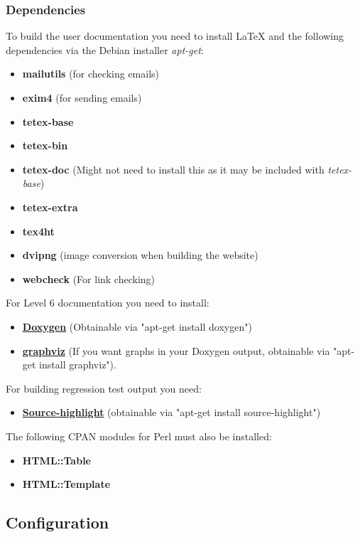 \documentclass[12pt]{article}
\begin{document}
\subsubsection*{Dependencies}

To build the user documentation you need to install \LaTeX\,\,and the following dependencies via the Debian installer {\it apt-get}:
\begin{itemize}
\item[]{\bf mailutils} (for checking emails)
\item[]{\bf exim4} (for sending emails)
\item[]{\bf tetex-base}
\item[]{\bf tetex-bin}
\item[]{\bf tetex-doc} (Might not need to install this as it may be included with {\it tetex-base})
\item[]{\bf tetex-extra}
\item[]{\bf tex4ht}
\item[]{\bf dvipng} (image conversion when building the website)
\item[]{\bf webcheck} (For link checking) 
\end{itemize}
For Level 6 documentation you need to install:
\begin{itemize}
   \item[]\href{http://www.doxygen.org/}{\bf Doxygen} (Obtainable via "apt-get install doxygen")
   \item[]\href{http://www.graphviz.org/Download.php}{\bf graphviz} (If you want graphs in your Doxygen output, obtainable via "apt-get install graphviz").
\end{itemize}
For building regression test output you need:
\begin{itemize}
   \item[]\href{http://www.gnu.org/software/src-highlite/}{\bf Source-highlight} (obtainable via "apt-get install source-highlight")
\end{itemize}
The following CPAN modules for Perl must also be installed:
\begin{itemize}
   \item[]{\bf HTML::Table}
   \item[]{\bf HTML::Template}
\end{itemize}


\subsection*{Configuration}
\end{document}
